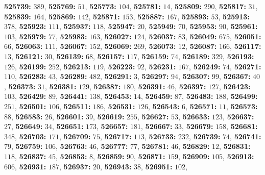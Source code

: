\textsf{\bfseries 525739:} $389$, \textsf{\bfseries 525769:} $51$, \textsf{\bfseries 525773:} $104$, \textsf{\bfseries 525781:} $14$, \textsf{\bfseries 525809:} $290$, \textsf{\bfseries 525817:} $31$, \textsf{\bfseries 525839:} $164$, \textsf{\bfseries 525869:} $142$, \textsf{\bfseries 525871:} $153$, \textsf{\bfseries 525887:} $167$, \textsf{\bfseries 525893:} $53$, \textsf{\bfseries 525913:} $378$, \textsf{\bfseries 525923:} $111$, \textsf{\bfseries 525937:} $118$, \textsf{\bfseries 525947:} $20$, \textsf{\bfseries 525949:} $70$, \textsf{\bfseries 525953:} $90$, \textsf{\bfseries 525961:} $103$, \textsf{\bfseries 525979:} $77$, \textsf{\bfseries 525983:} $163$, \textsf{\bfseries 526027:} $124$, \textsf{\bfseries 526037:} $83$, \textsf{\bfseries 526049:} $675$, \textsf{\bfseries 526051:} $66$, \textsf{\bfseries 526063:} $111$, \textsf{\bfseries 526067:} $152$, \textsf{\bfseries 526069:} $269$, \textsf{\bfseries 526073:} $12$, \textsf{\bfseries 526087:} $166$, \textsf{\bfseries 526117:} $13$, \textsf{\bfseries 526121:} $30$, \textsf{\bfseries 526139:} $68$, \textsf{\bfseries 526157:} $117$, \textsf{\bfseries 526159:} $74$, \textsf{\bfseries 526189:} $329$, \textsf{\bfseries 526193:} $126$, \textsf{\bfseries 526199:} $252$, \textsf{\bfseries 526213:} $119$, \textsf{\bfseries 526223:} $92$, \textsf{\bfseries 526231:} $167$, \textsf{\bfseries 526249:} $74$, \textsf{\bfseries 526271:} $110$, \textsf{\bfseries 526283:} $43$, \textsf{\bfseries 526289:} $482$, \textsf{\bfseries 526291:} $3$, \textsf{\bfseries 526297:} $94$, \textsf{\bfseries 526307:} $99$, \textsf{\bfseries 526367:} $40$, \textsf{\bfseries 526373:} $31$, \textsf{\bfseries 526381:} $129$, \textsf{\bfseries 526387:} $180$, \textsf{\bfseries 526391:} $46$, \textsf{\bfseries 526397:} $127$, \textsf{\bfseries 526423:} $103$, \textsf{\bfseries 526429:} $89$, \textsf{\bfseries 526441:} $138$, \textsf{\bfseries 526453:} $14$, \textsf{\bfseries 526459:} $87$, \textsf{\bfseries 526483:} $188$, \textsf{\bfseries 526499:} $251$, \textsf{\bfseries 526501:} $106$, \textsf{\bfseries 526511:} $186$, \textsf{\bfseries 526531:} $126$, \textsf{\bfseries 526543:} $6$, \textsf{\bfseries 526571:} $11$, \textsf{\bfseries 526573:} $88$, \textsf{\bfseries 526583:} $26$, \textsf{\bfseries 526601:} $39$, \textsf{\bfseries 526619:} $255$, \textsf{\bfseries 526627:} $53$, \textsf{\bfseries 526633:} $123$, \textsf{\bfseries 526637:} $27$, \textsf{\bfseries 526649:} $34$, \textsf{\bfseries 526651:} $173$, \textsf{\bfseries 526657:} $181$, \textsf{\bfseries 526667:} $33$, \textsf{\bfseries 526679:} $158$, \textsf{\bfseries 526681:} $348$, \textsf{\bfseries 526703:} $171$, \textsf{\bfseries 526709:} $75$, \textsf{\bfseries 526717:} $113$, \textsf{\bfseries 526733:} $232$, \textsf{\bfseries 526739:} $74$, \textsf{\bfseries 526741:} $79$, \textsf{\bfseries 526759:} $106$, \textsf{\bfseries 526763:} $46$, \textsf{\bfseries 526777:} $77$, \textsf{\bfseries 526781:} $46$, \textsf{\bfseries 526829:} $12$, \textsf{\bfseries 526831:} $118$, \textsf{\bfseries 526837:} $45$, \textsf{\bfseries 526853:} $8$, \textsf{\bfseries 526859:} $90$, \textsf{\bfseries 526871:} $159$, \textsf{\bfseries 526909:} $105$, \textsf{\bfseries 526913:} $606$, \textsf{\bfseries 526931:} $187$, \textsf{\bfseries 526937:} $20$, \textsf{\bfseries 526943:} $38$, \textsf{\bfseries 526951:} $102$, 
